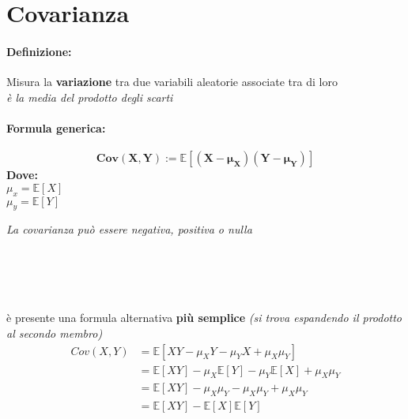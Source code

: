 \documentclass[]{article}
\newcommand{\ev}{\mathbb{E}[X]}
\renewcommand{\ev}[1]{\mathbb{E}[#1]}
\newcommand{\definizione}{\paragraph{Definizione:}}
\newcommand{\formula}{\paragraph{Formula generica:}}
\begin{document}
    \section{Covarianza}
    \definizione Misura la \textbf{variazione} tra due variabili aleatorie associate tra di loro \\
    \textit{è la media del prodotto degli scarti}
    \formula \[ \boldsymbol{Cov(X,Y) := \ev{(X - \mu_X) (Y - \mu_Y)}} \]
    \textbf{Dove:} \\
    $ \mu_x = \ev{X} $ \\
    $ \mu_y = \ev{Y} $ \\
    \linebreak[4]
    \centerline{\textit{La covarianza può essere negativa, positiva o nulla } }
     \\
     \\
     \\ \\
    è presente una formula alternativa \textbf{più semplice} \textit{(si trova espandendo il prodotto al secondo membro)}
    \begin{equation*}
        \begin{split} 
            Cov(X, Y) &= \ev{XY - \mu_XY - \mu_YX + \mu_X \mu_Y} \\
            & = \ev{XY} - \mu_X \ev{Y} - \mu_Y \ev{X} + \mu_X \mu_Y \\ 
            & = \ev{XY} - \mu_X \mu_Y - \mu_X \mu_Y  + \mu_X \mu_Y  \\
            & = \ev{XY} - \ev{X} \ev{Y}
        \end{split}
    \end{equation*}
\end{document}
